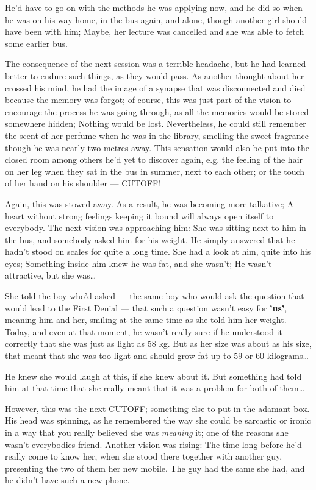 He'd have to go on with the methods he was applying now, and he did so when he was on his way home, in the bus again, and alone, though another girl should have been with him; Maybe, her lecture was cancelled and she was able to fetch some earlier bus.

The consequence of the next session was a terrible headache, but he had learned better to endure such things, as they would pass. 
As another thought about her crossed his mind, he had the image of a synapse that was disconnected and died because the memory was forgot; of course, this was just part of the vision to encourage the process he was going through, as all the memories would be stored somewhere hidden; Nothing would be lost. 
Nevertheless, he could still remember the scent of her perfume when he was in the library, smelling the sweet fragrance though he was nearly two metres away. 
This sensation would also be put into the closed room among others he'd yet to discover again, e.g. the feeling of the hair on her leg when they sat in the bus in summer, next to each other; or the touch of her hand on his shoulder --- CUTOFF!

Again, this was stowed away. 
As a result, he was becoming more talkative; A heart without strong feelings keeping it bound will always open itself to everybody. 
The next vision was approaching him: She was sitting next to him in the bus, and somebody asked him for his weight. He simply answered that he hadn't stood on scales for quite a long time. She had a look at him, quite into his eyes; Something inside him knew he was fat, and she wasn't; He wasn't attractive, but she was\ldots

She told the boy who'd asked --- the same boy who would ask the question that would lead to the First Denial --- that such a question wasn't easy for \textbf{'us'}, meaning him and her, smiling at the same time as she told him her weight. Today, and even at that moment, he wasn't really sure if he understood it correctly that she was just as light as 58 kg. But as her size was about as his size, that meant that she was too light and should grow fat up to 59 or 60 kilograms\ldots

He knew she would laugh at this, if she knew about it. But something had told him at that time that she really meant that it was a problem for both of them\ldots

However, this was the next CUTOFF; something else to put in the adamant box. 
His head was spinning, as he remembered the way she could be sarcastic or ironic in a way that you really believed she was \emph{meaning} it; one of the reasons she wasn't everybodies friend. 
Another vision was rising: The time long before he'd really come to know her, when she stood there together with another guy, presenting the two of them her new mobile. The guy had the same she had, and he didn't have such a new phone.

